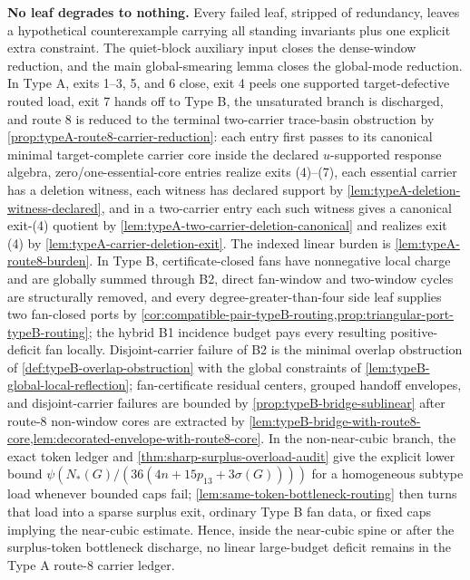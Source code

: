 \documentclass[11pt]{article}
\begin{document}
\noindent\textbf{No leaf degrades to nothing.}  Every failed leaf, stripped of redundancy, leaves a hypothetical counterexample carrying all standing invariants plus one explicit extra constraint.  The quiet-block auxiliary input closes the dense-window reduction, and the main global-smearing lemma closes the global-mode reduction.  In Type A, exits 1--3, 5, and 6 close, exit 4 peels one supported target-defective routed load, exit 7 hands off to Type B, the unsaturated branch is discharged, and route 8 is reduced to the terminal two-carrier trace-basin obstruction by \cref{prop:typeA-route8-carrier-reduction}: each entry first passes to its canonical minimal target-complete carrier core inside the declared $u$-supported response algebra, zero/one-essential-core entries realize exits (4)--(7), each essential carrier has a deletion witness, each witness has declared support by \cref{lem:typeA-deletion-witness-declared}, and in a two-carrier entry each such witness gives a canonical exit-(4) quotient by \cref{lem:typeA-two-carrier-deletion-canonical} and realizes exit (4) by \cref{lem:typeA-carrier-deletion-exit}.  The indexed linear burden is \cref{lem:typeA-route8-burden}.  In Type B, certificate-closed fans have nonnegative local charge and are globally summed through B2, direct fan-window and two-window cycles are structurally removed, and every degree-greater-than-four side leaf supplies two fan-closed ports by \cref{cor:compatible-pair-typeB-routing,prop:triangular-port-typeB-routing}; the hybrid B1 incidence budget pays every resulting positive-deficit fan locally.  Disjoint-carrier failure of B2 is the minimal overlap obstruction of \cref{def:typeB-overlap-obstruction} with the global constraints of \cref{lem:typeB-global-local-reflection}; fan-certificate residual centers, grouped handoff envelopes, and disjoint-carrier failures are bounded by \cref{prop:typeB-bridge-sublinear} after route-8 non-window cores are extracted by \cref{lem:typeB-bridge-with-route8-core,lem:decorated-envelope-with-route8-core}.  In the non-near-cubic branch, the exact token ledger and \cref{thm:sharp-surplus-overload-audit} give the explicit lower bound \(\psi(N_*(G)/(36(4n+15p_{13}+3\sigma(G))))\) for a homogeneous subtype load whenever bounded caps fail; \cref{lem:same-token-bottleneck-routing} then turns that load into a sparse surplus exit, ordinary Type B fan data, or fixed caps implying the near-cubic estimate.  Hence, inside the near-cubic spine or after the surplus-token bottleneck discharge, no linear large-budget deficit remains in the Type A route-8 carrier ledger.
\end{document}
